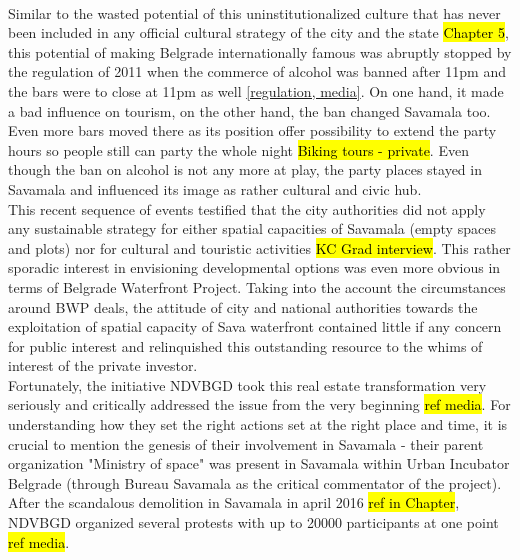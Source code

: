 \documentclass[11pt]{report}
\begin{document}
\\
Similar to the wasted potential of this uninstitutionalized culture that has never been included in any official cultural strategy of the city and the state \hl{Chapter 5}, this potential of making Belgrade internationally famous was abruptly stopped by the regulation of 2011 when the commerce of alcohol was banned after 11pm and the bars were to close at 11pm as well \ref{regulation, media}.
On one hand, it made a bad influence on tourism, on the other hand, the ban changed Savamala too. Even more bars moved there as its position offer possibility to extend the party hours so people still can party the whole night \hl{Biking tours - private}. Even though the ban on alcohol is not any more at play, the party places stayed in Savamala and influenced its image as rather cultural and civic hub.
\\
This recent sequence of events testified that the city authorities did not apply any sustainable strategy for either spatial capacities of Savamala (empty spaces and plots) nor for cultural and touristic activities \hl{KC Grad interview}. This rather sporadic interest in envisioning developmental options was even more obvious in terms of Belgrade Waterfront Project.
Taking into the account the circumstances around BWP deals, the attitude of city and national authorities towards the exploitation of spatial capacity of Sava waterfront contained little if any concern for public interest and relinquished this outstanding resource to the whims of interest of the private investor.
\\
Fortunately, the initiative NDVBGD took this real estate transformation very seriously and critically addressed the issue from the very beginning \hl{ref media}.
For understanding how they set the right actions set at the right place and time, it is crucial to mention the genesis of their involvement in Savamala - their parent organization "Ministry of space" was present in Savamala within Urban Incubator Belgrade (through Bureau Savamala as the critical commentator of the project).
After the scandalous demolition in Savamala in april 2016 \hl{ref in Chapter}, NDVBGD organized several protests with up to 20000 participants at one point \hl{ref media}.
\end{document}
